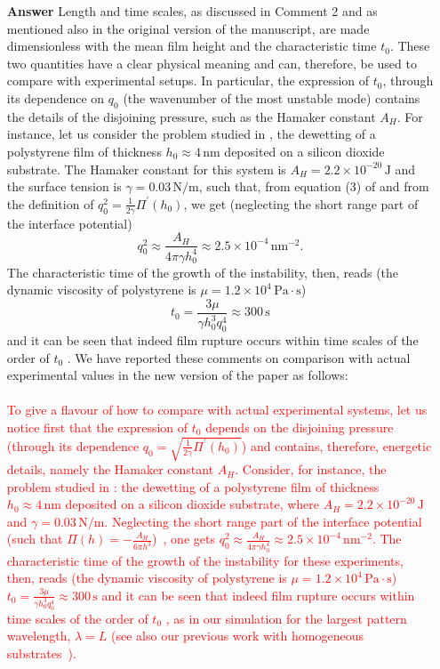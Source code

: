 \documentclass[12pt,english]{article}
\begin{document}
\begin{itemize}
\item[ \textbf{{Answer}}]
{
Length and time scales, as discussed in Comment 2 and as mentioned also in the original version of the manuscript, 
are made dimensionless with the mean film height and the characteristic time $t_0$. 
These two quantities 
have a clear physical meaning and can, therefore, be used to compare with 
experimental setups. In particular, the expression of $t_0$, through its dependence 
on $q_0$ (the wavenumber of the most unstable mode) contains the details 
of the disjoining pressure, such as the Hamaker constant $A_H$. For instance, let us consider the problem studied in \cite{becker2003complex}, the dewetting of a polystyrene film of thickness $h_0 \approx 4 \, \text{nm}$ deposited on a silicon 
dioxide substrate. The Hamaker constant for this system is 
$A_H  = 2.2 \times 10^{-20} \, \text{J}$ and the surface tension is 
$\gamma = 0.03 \, \text{N}/\text{m}$, such that, 
from equation (3) of \cite{becker2003complex} and 
from the definition of $q_0^2 = \frac{1}{2\gamma} \Pi^{\prime}(h_0)$, 
we get (neglecting the short range part of the interface potential)
$$
q_0^2 \approx \frac{A_H}{4\pi \gamma h_0^4} \approx 2.5 \times 10^{-4} \, \text{nm}^{-2}.
$$
The characteristic time of the growth of the instability, then, reads \cite{PhysRevLett.99.114503} (the dynamic viscosity of polystyrene is 
$\mu = 1.2 \times 10^4 \, \text{Pa} \cdot \text{s}$)
$$
t_0 = \frac{3\mu}{\gamma h_0^3 q_0^4} \approx 300 \, \text{s}
$$
and it can be seen that indeed film rupture occurs within time 
scales of the order of $t_0$ \cite{becker2003complex}.
We have reported these comments on comparison with actual experimental 
values in the new version of the paper as follows:\\
\\
\textcolor{red}{To give a flavour of how to compare with actual experimental systems, let us notice
first that the expression of $t_0$ depends on the disjoining pressure (through its dependence 
 $q_0 = \sqrt{\frac{1}{2\gamma} \Pi^{\prime}(h_0)}$) and contains, therefore, energetic details, namely 
 the Hamaker constant $A_H$. Consider, for instance, the problem studied in \cite{becker2003complex}: the dewetting of a polystyrene film of thickness $h_0 \approx 4 \, \text{nm}$ deposited on a silicon 
dioxide substrate, where $A_H  = 2.2 \times 10^{-20} \, \text{J}$ and 
$\gamma = 0.03 \, \text{N}/\text{m}$. Neglecting the short range part of the interface potential
(such that $\Pi(h)= - \frac{A_H}{6\pi h^3}$)~\cite{Mecke_2005,becker2003complex}, one gets 
$q_0^2 \approx \frac{A_H}{4\pi \gamma h_0^4} \approx 2.5 \times 10^{-4} \, \text{nm}^{-2}$.
The characteristic time of the growth of the instability for these experiments, then, reads \cite{PhysRevLett.99.114503} (the dynamic viscosity of polystyrene is 
$\mu = 1.2 \times 10^4 \, \text{Pa} \cdot \text{s}$) $t_0 = \frac{3\mu}{\gamma h_0^3 q_0^4} \approx 300 \, \text{s}$ and it can be seen that indeed film rupture occurs within time 
scales of the order of $t_0$ \cite{becker2003complex}, as in our 
simulation for the largest pattern wavelength, $\lambda = L$ (see also our previous work
with homogeneous substrates~\cite{PhysRevE.104.034801}).} 
\\

}
\end{itemize}
\end{document}
